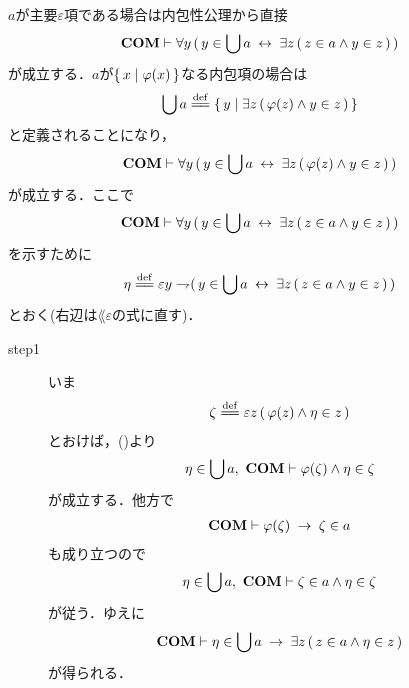 	\begin{sketch}
		$a$が主要$\varepsilon$項である場合は内包性公理から直接
		\begin{align}
			\mbox{\bf COM} \vdash \forall y\, (\, y \in \bigcup a \hspace{0.25em}\leftrightarrow\hspace{0.25em} 
				\exists z\, (\, z \in a \wedge y \in z\, )\, )
		\end{align}
		が成立する．$a$が$\left\{\, x \mid \varphi(x)\, \right\}$なる内包項の場合は
		\begin{align}
			\bigcup a \defeq \Set{y}{\exists z\, (\, \varphi(z) \wedge y \in z\, )}
		\end{align}
		と定義されることになり，
		\begin{align}
			\mbox{\bf COM} \vdash \forall y\, (\, y \in \bigcup a \hspace{0.25em}\leftrightarrow\hspace{0.25em} 
				\exists z\, (\, \varphi(z) \wedge y \in z\, )\, )
			\label{fom:comprehension_of_unions_1}
		\end{align}
		が成立する．ここで
		\begin{align}
			\mbox{\bf COM} \vdash \forall y\, (\, y \in \bigcup a \hspace{0.25em}\leftrightarrow\hspace{0.25em} 
				\exists z\, (\, z \in a \wedge y \in z\, )\, )
		\end{align}
		を示すために
		\begin{align}
			\eta \defeq \varepsilon y \negation (\, y \in \bigcup a \lrarrow 
				\exists z\, (\, z \in a \wedge y \in z\, )\, )
		\end{align}
		とおく(右辺は$\lang{\varepsilon}$の式に直す)．
		\begin{description}
			\item[step1]
				いま
				\begin{align}
					\zeta \defeq \varepsilon z\, (\, \varphi(z) \wedge \eta \in z\, )
				\end{align}
				とおけば，()より
				\begin{align}
					\eta \in \bigcup a,\ \mbox{\bf COM} \vdash
					\varphi(\zeta) \wedge \eta \in \zeta
				\end{align}
				が成立する．他方で
				\begin{align}
					\mbox{\bf COM} \vdash \varphi(\zeta) \hspace{0.25em}\rightarrow\hspace{0.25em} \zeta \in a
				\end{align}
				も成り立つので
				\begin{align}
					\eta \in \bigcup a,\ \mbox{\bf COM} \vdash
					\zeta \in a \wedge \eta \in \zeta
				\end{align}
				が従う．ゆえに
				\begin{align}
					\mbox{\bf COM} \vdash \eta \in \bigcup a \hspace{0.25em}\rightarrow\hspace{0.25em}
					\exists z\, (\, z \in a \wedge \eta \in z\, )
					\label{fom:comprehension_of_unions_2}
				\end{align}
				が得られる．
				

\end{description}
\end{sketch}
